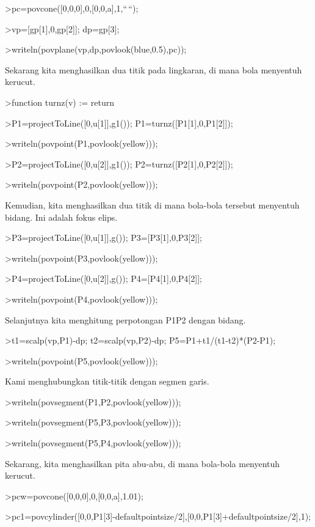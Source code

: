 \documentclass[
]{book}
\begin{document}
\textgreater pc=povcone({[}0,0,0{]},0,{[}0,0,a{]},1,``\,``);

\textgreater vp={[}gp{[}1{]},0,gp{[}2{]}{]}; dp=gp{[}3{]};

\textgreater writeln(povplane(vp,dp,povlook(blue,0.5),pc));

Sekarang kita menghasilkan dua titik pada lingkaran, di mana bola menyentuh kerucut.

\textgreater function turnz(v) := return

\textgreater P1=projectToLine({[}0,u{[}1{]}{]},g1()); P1=turnz({[}P1{[}1{]},0,P1{[}2{]}{]});

\textgreater writeln(povpoint(P1,povlook(yellow)));

\textgreater P2=projectToLine({[}0,u{[}2{]}{]},g1()); P2=turnz({[}P2{[}1{]},0,P2{[}2{]}{]});

\textgreater writeln(povpoint(P2,povlook(yellow)));

Kemudian, kita menghasilkan dua titik di mana bola-bola tersebut menyentuh bidang. Ini adalah fokus elips.

\textgreater P3=projectToLine({[}0,u{[}1{]}{]},g()); P3={[}P3{[}1{]},0,P3{[}2{]}{]};

\textgreater writeln(povpoint(P3,povlook(yellow)));

\textgreater P4=projectToLine({[}0,u{[}2{]}{]},g()); P4={[}P4{[}1{]},0,P4{[}2{]}{]};

\textgreater writeln(povpoint(P4,povlook(yellow)));

Selanjutnya kita menghitung perpotongan P1P2 dengan bidang.

\textgreater t1=scalp(vp,P1)-dp; t2=scalp(vp,P2)-dp; P5=P1+t1/(t1-t2)*(P2-P1);

\textgreater writeln(povpoint(P5,povlook(yellow)));

Kami menghubungkan titik-titik dengan segmen garis.

\textgreater writeln(povsegment(P1,P2,povlook(yellow)));

\textgreater writeln(povsegment(P5,P3,povlook(yellow)));

\textgreater writeln(povsegment(P5,P4,povlook(yellow)));

Sekarang, kita menghasilkan pita abu-abu, di mana bola-bola menyentuh kerucut.

\textgreater pcw=povcone({[}0,0,0{]},0,{[}0,0,a{]},1.01);

\textgreater pc1=povcylinder({[}0,0,P1{[}3{]}-defaultpointsize/2{]},{[}0,0,P1{[}3{]}+defaultpointsize/2{]},1);
\end{document}

